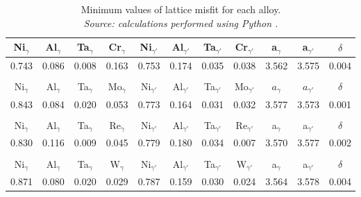 \begin{table}[H]
  \centering
  \begin{tabular}{rrrrrrrrrrr}
    \multicolumn{1}{c}{Ni$_\gamma$} & \multicolumn{1}{c}{Al$_\gamma$} & \multicolumn{1}{c}{Ta$_\gamma$} & \multicolumn{1}{c}{Cr$_\gamma$} & \multicolumn{1}{c}{Ni$_{\gamma'}$} & \multicolumn{1}{c}{Al$_{\gamma'}$} & \multicolumn{1}{c}{Ta$_{\gamma'}$} & \multicolumn{1}{c}{Cr$_{\gamma'}$} & \multicolumn{1}{c}{a$_\gamma$} & \multicolumn{1}{c}{a$_{\gamma'}$} & \multicolumn{1}{c}{$\delta$} \\ \hline \hline
    0.743 & 0.086 & 0.008 & 0.163 & 0.753 & 0.174 & 0.035 & 0.038 & 3.562 & 3.575 & 0.004 \\\\
   \multicolumn{1}{c}{Ni$_\gamma$} & \multicolumn{1}{c}{Al$_\gamma$} & \multicolumn{1}{c}{Ta$_\gamma$} & \multicolumn{1}{c}{Mo$_\gamma$} & \multicolumn{1}{c}{Ni$_{\gamma'}$} & \multicolumn{1}{c}{Al$_{\gamma'}$} & \multicolumn{1}{c}{Ta$_{\gamma'}$} & \multicolumn{1}{c}{Mo$_{\gamma'}$} & \multicolumn{1}{c}{$a_\gamma$} & \multicolumn{1}{c}{$a_{\gamma'}$} & \multicolumn{1}{c}{$\delta$} \\ \hline \hline
   0.843 & 0.084 & 0.020 & 0.053 & 0.773 & 0.164 & 0.031 & 0.032 & 3.577 & 3.573 & 0.001 \\\\
   \multicolumn{1}{c}{Ni$_\gamma$} & \multicolumn{1}{c}{Al$_\gamma$} & \multicolumn{1}{c}{Ta$_\gamma$} & \multicolumn{1}{c}{Re$_\gamma$} & \multicolumn{1}{c}{Ni$_{\gamma'}$} & \multicolumn{1}{c}{Al$_{\gamma'}$} & \multicolumn{1}{c}{Ta$_{\gamma'}$} & \multicolumn{1}{c}{Re$_{\gamma'}$} & \multicolumn{1}{c}{a$_\gamma$} & \multicolumn{1}{c}{a$_{\gamma'}$} & \multicolumn{1}{c}{$\delta$} \\ \hline \hline
   0.830 & 0.116 & 0.009 & 0.045 & 0.779 & 0.180 & 0.034 & 0.007 & 3.570 & 3.577 & 0.002 \\\\
   \multicolumn{1}{c}{Ni$_\gamma$} & \multicolumn{1}{c}{Al$_\gamma$} & \multicolumn{1}{c}{Ta$_\gamma$} & \multicolumn{1}{c}{W$_\gamma$} & \multicolumn{1}{c}{Ni$_{\gamma'}$} & \multicolumn{1}{c}{Al$_{\gamma'}$} & \multicolumn{1}{c}{Ta$_{\gamma'}$} & \multicolumn{1}{c}{W$_{\gamma'}$} & \multicolumn{1}{c}{a$_\gamma$} & \multicolumn{1}{c}{a$_{\gamma'}$} & \multicolumn{1}{c}{$\delta$} \\ \hline \hline
   0.871 & 0.080 & 0.020 & 0.029 & 0.787 & 0.159 & 0.030 & 0.024 & 3.564 & 3.578 & 0.004
  \end{tabular}
  \caption{\centering Minimum values of lattice misfit for each alloy. \\
  \textit{Source: calculations performed using Python \citep{mygit}.}}
  \label{tab:tab04}
\end{table}

